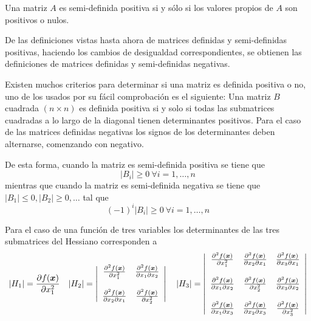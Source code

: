\begin{teorema}
Una matriz $A$ es semi-definida positiva si y s\'olo si los valores propios de
$A$ son positivos o nulos.
\end{teorema}

\begin{nota}
De las definiciones vistas hasta ahora de matrices definidas y semi-definidas
positivas, haciendo los cambios de desigualdad correspondientes, se obtienen
las definiciones de matrices definidas y semi-definidas negativas.

Existen muchos criterios para determinar si una matriz es definida positiva o
no, uno de los usados por su f\'acil comprobaci\'on es el siguiente: Una
matriz $B$ cuadrada $(n\times n)$ es definida positiva si y solo si todas las
submatrices cuadradas a lo largo de la diagonal tienen determinantes
positivos. Para el caso de las matrices definidas negativas los signos de los
determinantes deben alternarse, comenzando con negativo.

De esta forma, cuando la matriz es semi-definida positiva se tiene que
$$|B_i|\geq 0 \: \forall i=1,\ldots , n$$ 
mientras que cuando la matriz es semi-definida negativa se tiene que $|B_1|\leq 0,|B_2|\geq 0, \ldots$ tal que
\begin{equation*}
(-1)^i |B_i|\geq 0 \: \forall i=1,\ldots , n
\end{equation*}
\end{nota}

\begin{ejemplo}
Para el caso de una funci\'on de tres variables los determinantes de las tres submatrices del Hessiano corresponden a
\begin{equation*}
|H_1| =\frac{\partial f(\boldsymbol{x})}{\partial x_1^2}
\quad
|H_2| =\left|\begin{array}{cc}
\frac{\partial ^{2}f(\boldsymbol{x})}{\partial x_{1}^{2}} & \frac{\partial ^{2}f(\boldsymbol{x})}{\partial x_{1}\partial x_{2}} \\
 & \\
\frac{\partial ^{2}f(\boldsymbol{x})}{\partial x_{2}\partial x_{1}} & \frac{\partial ^{2}f(\boldsymbol{x})}{\partial x_{2}^2} \\ \end{array} \right|
\quad
|H_3| =\left|\begin{array}{ccc}
\frac{\partial ^{2}f(\boldsymbol{x})}{\partial x_{1}^{2}} & \frac{\partial ^{2}f(\boldsymbol{x})}{\partial x_{2}\partial x_{1}} & \frac{\partial ^{2}f(\boldsymbol{x})}{\partial x_{3}\partial x_{1}} \\
 & & \\
\frac{\partial ^{2}f(\boldsymbol{x})}{\partial x_{1}\partial x_{2}} & \frac{\partial ^{2}f(\boldsymbol{x})}{\partial x_{2}^{2}} & \frac{\partial ^{2}f(\boldsymbol{x})}{\partial x_{3}\partial x_{2}} \\
 & & \\
\frac{\partial ^{2}f(\boldsymbol{x})}{\partial x_{1}\partial x_{3}} & \frac{\partial ^{2}f(\boldsymbol{x})}{\partial x_{2}\partial x_{3}} & \frac{\partial ^{2}f(\boldsymbol{x})}{\partial x_{3}^2} \\ \end{array} \right|
\end{equation*}
\end{ejemplo}